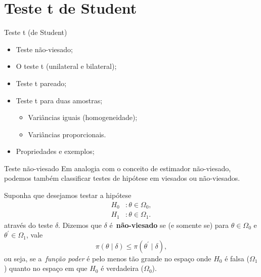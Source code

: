 \section{Teste t de Student}
\begin{frame}{Teste t (de Student)}
 \begin{itemize}
   \item Teste não-viesado;
   \item O teste t (unilateral e bilateral);
   \item Teste t pareado;
   \item Teste t para duas amostras;
   \begin{itemize}
    \item Variâncias iguais (homogeneidade);
    \item Variâncias proporcionais.
   \end{itemize}
   \item Propriedades e exemplos;
   \end{itemize}
\end{frame}

\begin{frame}{Teste não-viesado}
 Em analogia com o conceito de estimador não-viesado, podemos também classificar testes de hipótese em viesados ou não-viesados.
 \begin{defn}
 \label{def:unbiased_tests}
  Suponha que desejamos testar a hipótese
  \begin{align*}
   H_0 &: \theta \in \Omega_0, \\
   H_1&:  \theta \in \Omega_1. 
  \end{align*}
  através do teste $\delta$.
  Dizemos que $\delta$ é~\textbf{não-viesado} se (e somente se) para $\theta \in \Omega_0$ e $\theta^\prime \in \Omega_1$, vale 
  \[ \pi(\theta \mid \delta) \leq   \pi(\theta^\prime \mid \delta),\]
  ou seja, se a~\textit{função poder} é pelo menos tão grande no espaço onde $H_0$ é falsa ($\Omega_1$) quanto no espaço em que $H_0$ é verdadeira ($\Omega_0$). 
 \end{defn}
\end{frame}

